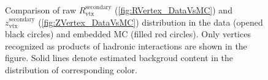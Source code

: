 \begin{figure}[ht]
\centering
\parbox{0.4725\textwidth}{
  \centering
  \begin{subfigure}[b]{\linewidth}
  \end{subfigure}
}%
\quad\quad%
\parbox{0.4725\textwidth}{
  \centering
  \begin{subfigure}[b]{\linewidth}
  \end{subfigure}
}\vspace{-5pt}%
\caption[Comparison of raw $R_{\text{vtx}}^{\text{secondary}}$ and $z_{\text{vtx}}^{\text{secondary}}$ distribution in the data and embedded MC.]%
{Comparison of raw $R_{\text{vtx}}^{\text{secondary}}$ (\ref{fig:RVertex_DataVsMC}) and $z_{\text{vtx}}^{\text{secondary}}$ (\ref{fig:ZVertex_DataVsMC}) distribution in the data (opened black circles) and embedded MC (filled red circles). Only vertices recognized as products of hadronic interactions are shown in the figure. Solid lines denote estimated backgroud content in the distribution of corresponding color.}\vspace{-10pt}\label{fig:RZVertexDataVsMC}%
\end{figure}
